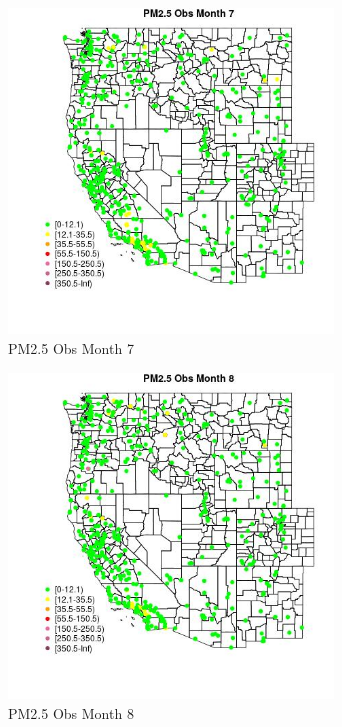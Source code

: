 \begin{figure} 
\centering  
\includegraphics[width=0.77\textwidth]{Code_Outputs/Report_ML_input_PM25_Step4_part_e_de_duplicated_aveswNAs_MapObsMo7PM25_Obs.jpg} 
\caption{\label{fig:Report_ML_input_PM25_Step4_part_e_de_duplicated_aveswNAsMapObsMo7PM25_Obs}PM2.5 Obs Month 7} 
\end{figure} 
 

\begin{figure} 
\centering  
\includegraphics[width=0.77\textwidth]{Code_Outputs/Report_ML_input_PM25_Step4_part_e_de_duplicated_aveswNAs_MapObsMo8PM25_Obs.jpg} 
\caption{\label{fig:Report_ML_input_PM25_Step4_part_e_de_duplicated_aveswNAsMapObsMo8PM25_Obs}PM2.5 Obs Month 8} 
\end{figure} 
 

